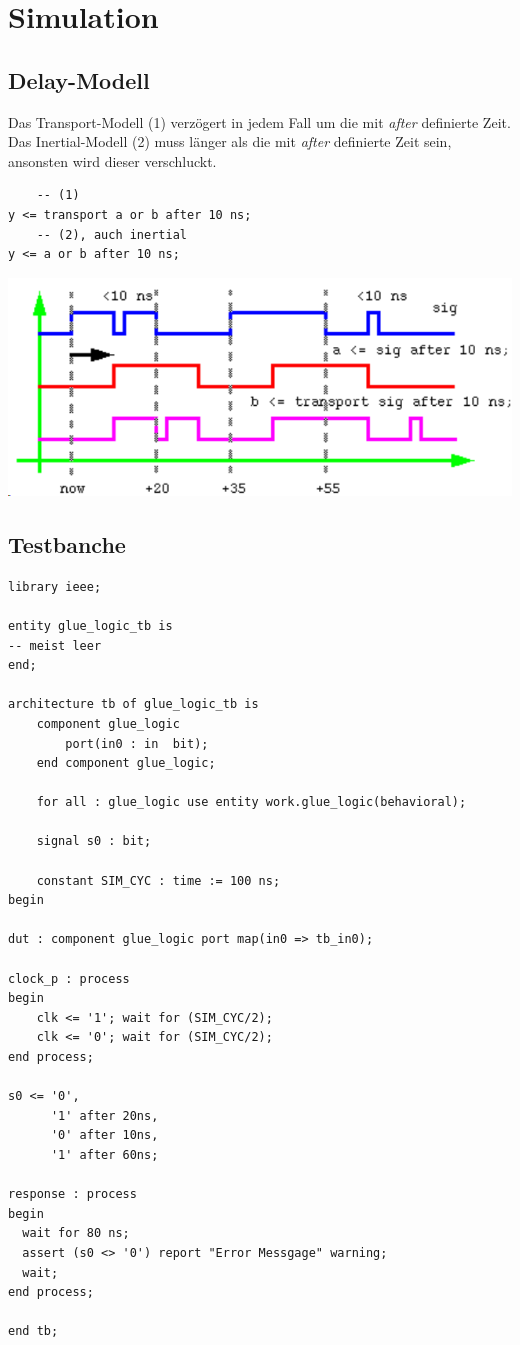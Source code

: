 \section{Simulation}

\subsection{Delay-Modell}
Das Transport-Modell (1) verzögert in jedem Fall um die mit \textit{after} definierte Zeit.\\
Das Inertial-Modell (2) muss länger als die mit \textit{after} definierte Zeit sein, ansonsten wird dieser verschluckt.
\begin{lstlisting}
	-- (1)
y <= transport a or b after 10 ns;
	-- (2), auch inertial
y <= a or b after 10 ns;
\end{lstlisting}

\begin{center}
	\includegraphics[width=0.8\columnwidth]{Images/transport_example}
\end{center}



\subsection{Testbanche}
\begin{lstlisting}
library ieee;

entity glue_logic_tb is
-- meist leer
end;

architecture tb of glue_logic_tb is
	component glue_logic
		port(in0 : in  bit);
	end component glue_logic;
	
	for all : glue_logic use entity work.glue_logic(behavioral);

	signal s0 : bit;
	
	constant SIM_CYC : time := 100 ns;
begin

dut : component glue_logic port map(in0 => tb_in0);

clock_p : process
begin
	clk <= '1'; wait for (SIM_CYC/2);
	clk <= '0'; wait for (SIM_CYC/2);
end process;

s0 <= '0', 
      '1' after 20ns,
      '0' after 10ns,
      '1' after 60ns;
      
response : process 
begin
  wait for 80 ns;
  assert (s0 <> '0') report "Error Messgage" warning;
  wait;
end process;

end tb;
\end{lstlisting}
